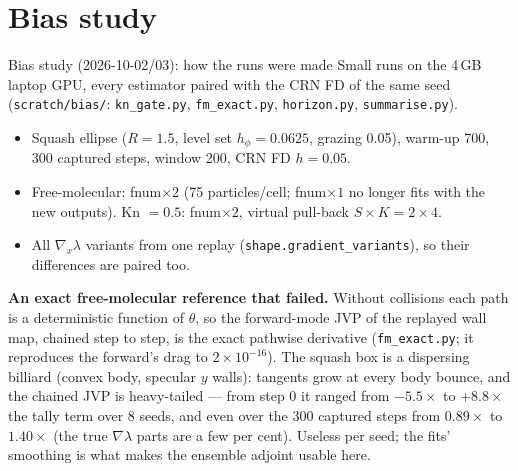 \documentclass[10pt,aspectratio=169]{beamer}
\newcommand{\code}[1]{\texttt{\small #1}}
\begin{document}
\section{Bias study}

\begin{frame}{Bias study (2026-10-02/03): how the runs were made}
Small runs on the 4\,GB laptop GPU, every estimator paired with the CRN FD of the same seed
(\code{scratch/bias/}: \code{kn\_gate.py}, \code{fm\_exact.py}, \code{horizon.py},
\code{summarise.py}).
\begin{itemize}
\item Squash ellipse ($R = 1.5$, level set $h_\phi = 0.0625$, grazing 0.05), warm-up 700,
  300 captured steps, window 200, CRN FD $h = 0.05$.
\item Free-molecular: fnum$\times2$ (75 particles/cell; fnum$\times1$ no longer fits with the new
  outputs).  Kn $=0.5$: fnum$\times2$, virtual pull-back $S\times K = 2\times4$.
\item All $\nabla_x\lambda$ variants from one replay (\code{shape.gradient\_variants}), so
  their differences are paired too.
\end{itemize}
\textbf{An exact free-molecular reference that failed.}  Without collisions each path is a
deterministic function of $\theta$, so the forward-mode JVP of the replayed wall map, chained
step to step, is the exact pathwise derivative (\code{fm\_exact.py}; it reproduces the
forward's drag to $2\times10^{-16}$).  The squash box is a dispersing billiard (convex body,
specular $y$ walls): tangents grow at every body bounce, and the chained JVP is heavy-tailed
--- from step 0 it ranged from $-5.5\times$ to $+8.8\times$ the tally term over 8 seeds, and even
over the 300 captured steps from $0.89\times$ to $1.40\times$ (the true $\nabla\lambda$ parts are a
few per cent).  Useless per seed; the fits' smoothing is what makes the
ensemble adjoint usable here.
\end{frame}
\end{document}
